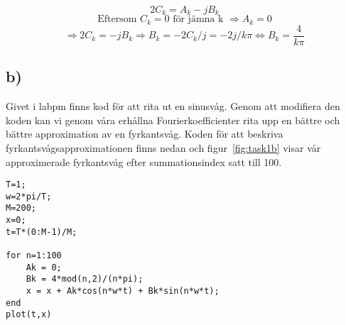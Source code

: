 $$2C_k = A_k - jB_k $$
$$\text{Eftersom $C_k = 0$ för jämna k } \Rightarrow A_k = 0$$
$$\Rightarrow 2C_k = -jB_k \Rightarrow B_k = -2C_k/j = -2j/k\pi \Leftrightarrow
B_k = \frac{4}{k\pi}$$

\subsection*{b)}
Givet i labpm finns kod för att rita ut en sinusvåg. Genom att modifiera den
koden kan vi genom våra erhållna Fourierkoefficienter rita upp en bättre och
bättre approximation av en fyrkantsvåg. Koden för att beskriva
fyrkantsvågsapproximationen finns nedan och figur~\ref{fig:task1b} visar vår 
approximerade fyrkantsvåg efter summationsindex satt till 100.

\begin{lstlisting}
T=1;
w=2*pi/T;
M=200;
x=0;
t=T*(0:M-1)/M;

for n=1:100
    Ak = 0;
    Bk = 4*mod(n,2)/(n*pi);
    x = x + Ak*cos(n*w*t) + Bk*sin(n*w*t);
end
plot(t,x)
\end{lstlisting}
